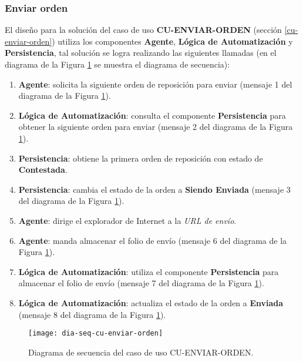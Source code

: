 \subsubsection{Enviar orden}
El diseño para la solución del caso de uso \textbf{CU-ENVIAR-ORDEN} (sección \ref{cu-enviar-orden}) utiliza los componentes \textbf{Agente}, \textbf{Lógica de Automatización} y \textbf{Persistencia}, tal solución se logra realizando las siguientes llamadas (en el diagrama de la Figura \ref{fig:dia-seq-cu-enviar-orden} se muestra el diagrama de secuencia):
\begin{enumerate}
	\item \textbf{Agente}: solicita la siguiente orden de reposición para enviar (mensaje 1 del diagrama de la Figura \ref{fig:dia-seq-cu-enviar-orden}).
	\item \textbf{Lógica de Automatización}: consulta el componente \textbf{Persistencia} para obtener la siguiente orden para enviar (mensaje 2 del diagrama de la Figura \ref{fig:dia-seq-cu-enviar-orden}).
	\item \textbf{Persistencia}: obtiene la primera orden de reposición con estado de \textbf{Contestada}.
	\item \textbf{Persistencia}: cambia el estado de la orden a \textbf{Siendo Enviada} (mensaje 3 del diagrama de la Figura \ref{fig:dia-seq-cu-enviar-orden}).
	\item \textbf{Agente}: dirige el explorador de Internet a la \textit{URL de envío}.
	\item \textbf{Agente}: manda almacenar el folio de envío (mensaje 6 del diagrama de la Figura \ref{fig:dia-seq-cu-enviar-orden}).
	\item \textbf{Lógica de Automatización}: utiliza el componente \textbf{Persistencia} para almacenar el folio de envío (mensaje 7 del diagrama de la Figura \ref{fig:dia-seq-cu-enviar-orden}).
	\item \textbf{Lógica de Automatización}: actualiza el estado de la orden a \textbf{Enviada} (mensaje 8 del diagrama de la Figura \ref{fig:dia-seq-cu-enviar-orden}).
\end{enumerate}

\begin{figure}[h]
	\centering
	\texttt{[image: dia-seq-cu-enviar-orden]}
	\caption{Diagrama de secuencia del caso de uso CU-ENVIAR-ORDEN.}
	\label{fig:dia-seq-cu-enviar-orden}
\end{figure}

